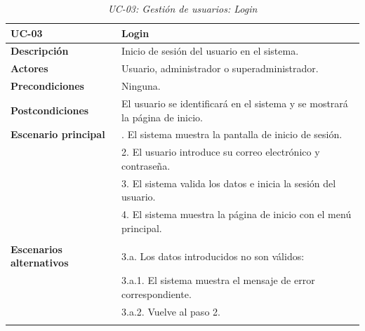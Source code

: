 \begin{table}
  \begin{center}
    \begin{tabularx}{16.4cm}{|l|X|}
      \hline
      \textbf{UC-03} & \textbf{Login}\\
      \hline
      \textbf{Descripción} & Inicio de sesión del usuario en el sistema.\\
      \hline
      \textbf{Actores} & Usuario, administrador o superadministrador.\\
      \hline
      \textbf{Precondiciones} & Ninguna.\\
      \hline
      \textbf{Postcondiciones} & El usuario se identificará en el sistema y se mostrará la página de inicio.\\
      \hline
      \textbf{Escenario principal} & \smallskip 1. El sistema muestra la pantalla de inicio de sesión.\\
      & 2. El usuario introduce su correo electrónico y contraseña.\\
      & 3. El sistema valida los datos e inicia la sesión del usuario.\\
      & 4. El sistema muestra la página de inicio con el menú principal.\\
      & \\
      \hline
      \textbf{Escenarios alternativos} & \smallskip 3.a. Los datos introducidos no son válidos:\\
      & \hspace{0.3cm} 3.a.1. El sistema muestra el mensaje de error correspondiente.\\
      & \hspace{0.3cm} 3.a.2. Vuelve al paso 2.\\
      & \\
      \hline
    \end{tabularx}
    \caption{\textit{UC-03: Gestión de usuarios: Login}}
    \label{tab:CU-login}
  \end{center}
\end{table}


